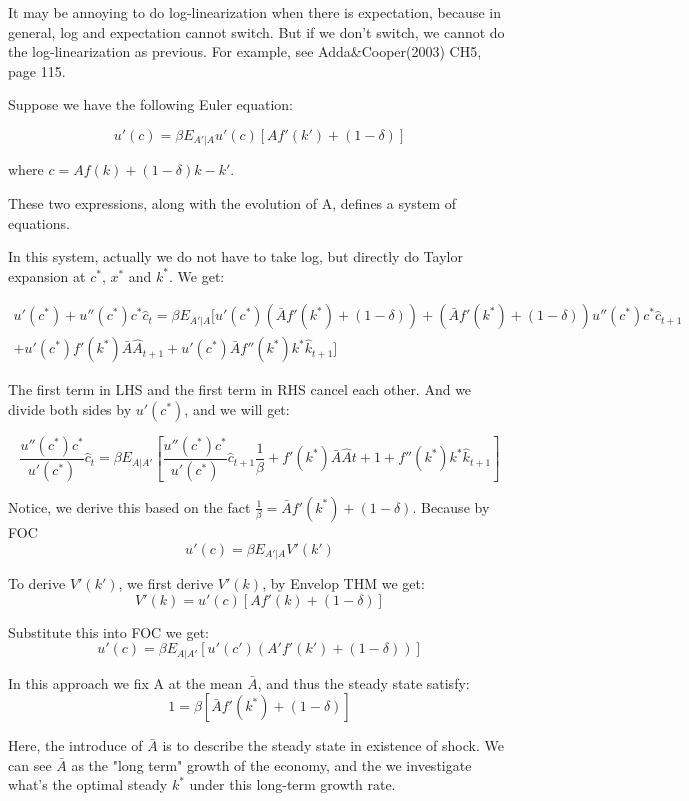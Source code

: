 \documentclass{book}
\theoremstyle{plain}
\theoremstyle{definition}
\begin{document}
It may be annoying to do log-linearization when there is expectation,
because in general,
log and expectation cannot switch.
But if we don't switch, we cannot do the log-linearization as previous.
For example, see Adda\&Cooper(2003) CH5, page 115.

Suppose we have the following Euler equation:

\[u'(c)=\beta E_{A'|A}u'(c)[Af'(k')+(1-\delta)]\]

where $c=Af(k)+(1-\delta)k-k'$.

These two expressions, along with the evolution of A,
defines a system of equations.

In this system, actually we do not have to take log,
but directly do Taylor expansion at $c^*$, $x^*$ and $k^*$.
We get:

\begin{multline}
u'(c^*)+u''(c^*)c^*\hat c_t=
\beta E_{A'|A}[u'(c^*)(\bar Af'(k^*)+(1-\delta))
+(\bar Af'(k^*)+(1-\delta))u''(c^*)c^*\hat c_{t+1}\\
+u'(c^*)f'(k^*)\bar A\hat A_{t+1}+
u'(c^*)\bar Af''(k^*)k^* \hat k_{t+1}]
\end{multline}


The first term in LHS and the first term in RHS cancel each other.
And we divide both sides by $u'(c^*)$, and we will get:

\begin{equation}\label{eq1}
\frac{u''(c^*)c^*}{u'(c^*)}\hat c_t
=\beta E_{A|A'}[\frac{u''(c^*)c^*}{u'(c^*)}\hat c_{t+1} \frac{1}{\beta}
+f'(k^*)\bar A \hat A{t+1}
+f''(k^*)k^*\hat k_{t+1}]
\end{equation}

Notice, we derive this based on the fact $\frac{1}{\beta}=\bar A f'(k^*)+(1-\delta)$.
Because by FOC
\[u'(c)=\beta E_{A'|A}V'(k')\]

To derive $V'(k')$, we first derive $V'(k)$,
by Envelop THM we get:
\[V'(k)=u'(c)[Af'(k)+(1-\delta)]\]

Substitute this into FOC we get:
\[u'(c)=\beta E_{A|A'}[u'(c')(A'f'(k')+(1-\delta))]\]

In this approach we fix A at the mean $\bar A$,
and thus the steady state satisfy:
\[1=\beta [\bar Af'(k^*)+(1-\delta)]\]

Here, the introduce of $\bar A$ is to describe the steady state in existence of shock.
We can see $\bar A$ as the "long term" growth of the economy,
and the we investigate what's the optimal steady $k^*$ under this long-term growth rate.
\end{document}
